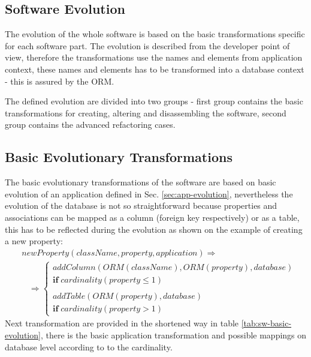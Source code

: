 \documentclass[11pt]{article}
\begin{document}
\subsection{Software Evolution}
\label{sec:sw-evolution}
The evolution of the whole software is based on the basic transformations specific for each software part. The evolution is described from the developer point of view, therefore the transformations use the names and elements from application context, these names and elements has to be transformed into a database context - this is assured by the ORM.

The defined evolution are divided into two groups - first group contains the basic transformations for creating, altering and disassembling the software, second group contains the advanced refactoring cases.

\subsection{Basic Evolutionary Transformations}
The basic evolutionary transformations of the software are based on basic evolution of an application defined in Sec. \ref{sec:app-evolution}, nevertheless the evolution of the database is not so straightforward because properties and associations can be mapped as a column (foreign key respectively) or as a table, this has to be reflected during the evolution as shown on the example of creating a new property: 
\begin{align*}
& newProperty(className, property, application) \Rightarrow \\
& \;\;\; \Rightarrow \begin{cases}
  addColumn(ORM(className), ORM(property), database) \\\mathbf{if} \; cardinality(property \leq 1)  \\\\
  addTable(ORM(property), database) \\
  \mathbf{if} \; cardinality(property > 1)  
 \end{cases}
\end{align*}
Next transformation are provided in the shortened way in table \ref{tab:sw-basic-evolution}, there is the basic application transformation and possible mappings on database level according to to the cardinality.  
\end{document}
